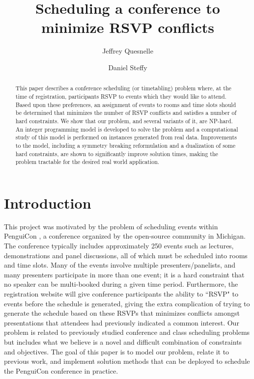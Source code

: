 \documentclass{svjour3}                     %
\begin{document}
	
\title{Scheduling a conference to minimize RSVP conflicts}
\author{Jeffrey Quesnelle \and Daniel Steffy}
	

\maketitle
	
\begin{abstract}
This paper describes a conference scheduling (or timetabling) problem where, at the time of registration, participants RSVP to events which they would like to attend.
Based upon these preferences, an assignment of events to rooms and time slots should be determined that minimizes the number of RSVP conflicts and satisfies a number of hard constraints.
We show that our problem, and several variants of it, are NP-hard.
An integer programming model is developed to solve the problem and a computational study of this model is performed on instances generated from real data.
Improvements to the model, including a symmetry breaking reformulation and a dualization of some hard constraints, are shown to significantly improve solution times, making the problem tractable for the desired real world application.
\end{abstract}

\section{Introduction}


This project was motivated by the problem of scheduling events within PenguiCon \cite{pc}, a conference organized by the open-source community in Michigan.  
The conference typically includes approximately 250 events such as lectures, demonstrations and panel discussions, all of which must be scheduled into rooms and time slots.
Many of the events involve multiple presenters/panelists, and many presenters participate in more than one event; it is a hard constraint that no speaker can be multi-booked during a given time period.
Furthermore, the registration website will give conference participants the ability to ``RSVP" to events before the schedule is generated, giving the extra complication of trying to generate the schedule based on these RSVPs that minimizes conflicts amongst presentations that attendees had previously indicated a common interest.
Our problem is related to previously studied conference and class scheduling problems but includes what we believe is a novel and difficult combination of constraints and objectives.
The goal of this paper is to model our problem, relate it to previous work, and implement solution methods that can be deployed to schedule the PenguiCon conference in practice.
\end{document}
